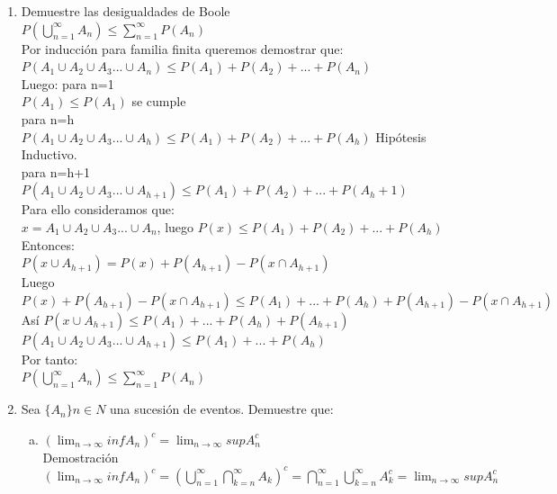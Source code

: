 \documentclass[12pt]{article}
\begin{document}
\begin{enumerate}
\item Demuestre las desigualdades de Boole\\[0.2cm]
$P\left(\displaystyle\bigcup_{n=1}^{\infty}{A_n}\right) \leqslant \displaystyle\sum_{n=1}^{\infty}P\left(A_n\right) $\\[0.2cm]
Por inducción para familia finita queremos demostrar que:\\[0.2cm]
$P\left(A_1\cup A_2\cup A_3...\cup A_n\right) \leqslant P\left(A_1\right)+ P\left(A_2\right)+...+P\left(A_n\right)$	\\[0.2cm]
Luego: para n=1\\[0.2cm]
$P\left(A_1\right)\leqslant P\left(A_1\right) $ se cumple\\[0.2cm]
para n=h\\[0.2cm]
$P\left(A_1\cup A_2\cup A_3...\cup A_h\right)\leqslant P\left(A_1\right)+ P\left(A_2\right)+...+P\left(A_h\right)$ Hipótesis Inductivo.\\[0.2cm]
para n=h+1\\[0.2cm]
$P\left(A_1\cup A_2\cup A_3...\cup A_{h+1}\right)\leqslant P\left(A_1\right)+ P\left(A_2\right)+...+P\left(A_h+1\right)$\\[0.2cm]
Para ello consideramos que:\\[0.2cm]
$x=A_1\cup A_2\cup A_3...\cup A_n$, luego $P\left(x\right) \leqslant P\left(A_1\right)+ P\left(A_2\right)+...+P\left(A_h\right) $\\[0.2cm]
Entonces:\\[0.2cm]
$P\left(x \cup A_{h+1}\right)= P\left(x\right)+P\left(A_{h+1}\right)-P\left(x \cap A_{h+1}\right)$\\[0.2cm]
Luego\\[0.2cm]
$P\left(x\right)+P\left(A_{h+1}\right)-P\left(x \cap A_{h+1}\right)\leqslant P\left(A_1\right)+...+P\left(A_h\right)+P\left(A_{h+1}\right)-P\left(x \cap A_{h+1}\right)$\\[0.2cm]
Así $P\left(x \cup A_{h+1}\right)\leqslant P\left(A_1\right)+...+P\left(A_h\right)+P\left(A_{h+1}\right) $\\[0.2cm]
$P\left(A_1\cup A_2\cup A_3...\cup A_{h+1}\right)\leqslant P\left(A_1\right)+...+P\left(A_h\right)
$\\[0.2cm]
Por tanto:\\[0.2cm]
$P\left(\displaystyle\bigcup_{n=1}^{\infty}{A_n}\right) \leqslant \displaystyle\sum_{n=1}^{\infty}P\left(A_n\right) $


\item Sea $\{A_n\}n \in {N}$ una sucesión de eventos. Demuestre que:
\begin{enumerate}[a)]
\item $\left(\displaystyle\lim_{n\longrightarrow \infty}{inf}A_n\right)^c =\displaystyle\lim_{n\longrightarrow \infty} {sup}{A_n^c} $\\[0.2cm]
Demostración\\[0.2cm]
$\left(\displaystyle\lim_{n\longrightarrow \infty}{inf}A_n\right)^c=\left(\displaystyle\bigcup_{n=1}^{\infty}\displaystyle\bigcap_{k=n}^{\infty}{A_k}\right)^c = \displaystyle\bigcap_{n=1}^{\infty}\displaystyle\bigcup_{k=n}^{\infty}{A_k^c}=\displaystyle\lim_{n\longrightarrow \infty} {sup}{A_n^c}$


\end{enumerate}
\end{enumerate}
\end{document}

